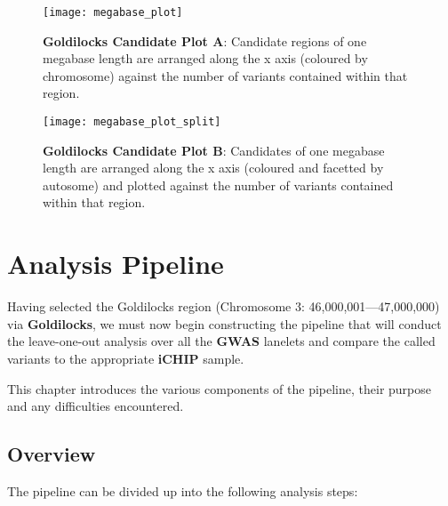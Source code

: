 \begin{figure}[htbp!]
    \centering
    \texttt{[image: megabase\_plot]}
    \caption[megabaseplot]{\textbf{Goldilocks Candidate Plot A}: Candidate regions
    of one megabase length are arranged along the x axis (coloured by
chromosome) against the number of variants contained within that region.}
    \label{fig:megabaseplot}
\end{figure}
\begin{figure}[htbp!]
    \centering
    \texttt{[image: megabase\_plot\_split]}
    \caption[megabaseplotsplit]{\textbf{Goldilocks Candidate Plot B}: Candidates
        of one megabase length are arranged along the x axis (coloured
        and facetted by autosome) and plotted against the number of variants contained
    within that region.}
    \label{fig:megabaseplotsplit}
\end{figure}


\chapter{Analysis Pipeline}
\label{chap:pipeline}

Having selected the Goldilocks region (Chromosome 3: 46,000,001---47,000,000)
via \textbf{Goldilocks}, we must now begin constructing the pipeline that will
conduct the leave-one-out analysis over all the \textbf{GWAS} lanelets and
compare the called variants to the appropriate \textbf{iCHIP} sample.

This chapter introduces the various components of the pipeline, their purpose
and any difficulties encountered.

\section{Overview}


The pipeline can be divided up into the following analysis steps:

